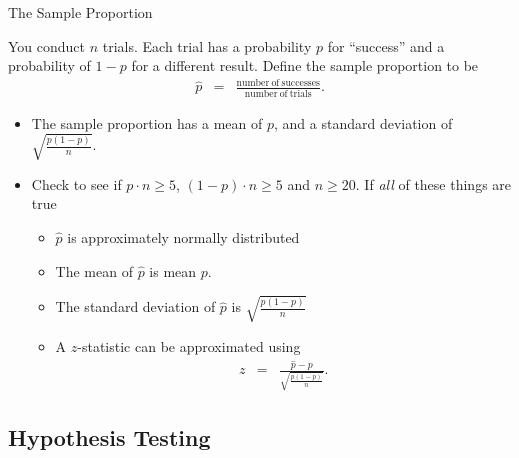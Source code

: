 \begin{frame}{The Sample Proportion}

  You conduct $n$ trials. Each trial has a probability $p$ for
  ``success'' and a probability of $1-p$ for a different
  result. Define the sample proportion to be 
  \begin{eqnarray*}
    \hat{p} & = & \frac{\mathrm{number~of~successes}}{\mathrm{number~of~trials}}.
  \end{eqnarray*}

  \begin{itemize}
  \item The sample proportion has a mean of $p$, and a standard
    deviation of $\sqrt{\frac{p(1-p)}{n}}$.
  \item Check to see if $p\cdot n \geq 5$, $(1-p)\cdot n \geq 5$ and
    $n\geq 20$. If \textit{all} of these things are true
    \begin{itemize}
    \item $\hat{p}$ is approximately normally distributed
    \item The mean of $\hat{p}$ is mean $p$.
    \item The standard deviation of $\hat{p}$ is
      $\sqrt{\frac{p(1-p)}{n}}$
    \item A $z$-statistic can be approximated using
      \begin{eqnarray*}
        z & = & \frac{\hat{p}-p}{\sqrt{\frac{p(1-p)}{n}}}.
      \end{eqnarray*}
    \end{itemize}

  \end{itemize}



  
\end{frame}



\subsection{Hypothesis Testing}

